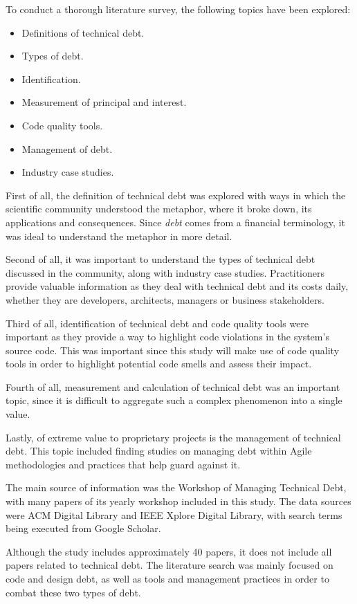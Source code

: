 \documentclass{mprop}
\begin{document}
To conduct a thorough literature survey, the following topics have been explored:
\begin{itemize}
	\item Definitions of technical debt.
	\item Types of debt.
	\item Identification.
	\item Measurement of principal and interest.
	\item Code quality tools.
	\item Management of debt.
	\item Industry case studies.
\end{itemize}

First of all, the definition of technical debt was explored with ways in which
the scientific community understood the metaphor, where it broke down, its
applications and consequences. Since \emph{debt} comes from a financial
terminology, it was ideal to understand the metaphor in more detail.

Second of all, it was important to understand the types of technical debt
discussed in the community, along with industry case studies. Practitioners
provide valuable information as they deal with technical debt and its costs
daily, whether they are developers, architects, managers or business
stakeholders.

Third of all, identification of technical debt and code quality tools were
important as they provide a way to highlight code violations in the system's
source code. This was important since this study will make use of code quality
tools in order to highlight potential code smells and assess their impact.

Fourth of all, measurement and calculation of technical debt was an important
topic, since it is difficult to aggregate such a complex phenomenon into a
single value.

Lastly, of extreme value to proprietary projects is the management of technical
debt. This topic included finding studies on managing debt within Agile
methodologies and practices that help guard against it.

The main source of information was the Workshop of Managing Technical Debt, with
many papers of its yearly workshop included in this study. The data sources were
ACM Digital Library and IEEE Xplore Digital Library, with search terms being
executed from Google Scholar.

Although the study includes approximately 40 papers, it does not include all
papers related to technical debt. The literature search was mainly focused on
code and design debt, as well as tools and management practices in order to
combat these two types of debt.
\end{document}
